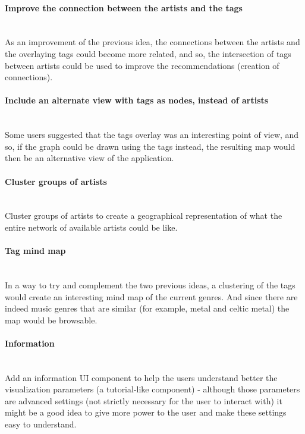   \paragraph*{Improve the connection between the artists and the tags} \hfill \\
  \indent As an improvement of the previous idea, the connections between the artists and the overlaying tags could become more related, and so, the intersection of tags between artists could be used to improve the recommendations (creation of connections). 

  \paragraph*{Include an alternate view with tags as nodes, instead of artists} \hfill \\
  \indent Some users suggested that the tags overlay was an interesting point of view, and so, if the graph could be drawn using the tags instead, the resulting map would then be an alternative view of the application.

  \paragraph*{Cluster groups of artists} \hfill \\
  \indent Cluster groups of artists to create a geographical representation of what the entire network of available artists could be like.

  \paragraph*{Tag mind map} \hfill \\
  \indent In a way to try and complement the two previous ideas, a clustering of the tags would create an interesting mind map of the current genres.
  And since there are indeed music genres that are similar (for example, metal and celtic metal) the map would be browsable.

  \paragraph*{Information} \hfill \\
  \indent Add an information UI component to help the users understand better the visualization parameters (a tutorial-like component) - although those parameters are advanced settings (not strictly necessary for the user to interact with) it might be a good idea to give more power to the user and make these settings easy to understand.


